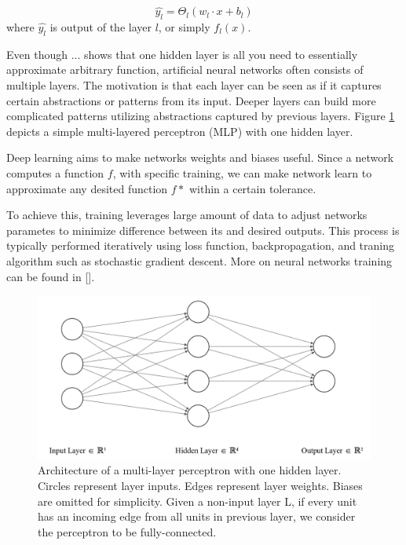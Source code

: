 \begin{equation}
\hat{y_l} = \Theta_l(w_l \cdot x + b_l)
\end{equation}
where $\hat{y_l}$ is output of the layer $l$, or simply $f_l(x)$.



Even though ... shows that one hidden layer is all you need to essentially approximate arbitrary function, artificial neural networks often consists of multiple layers. The motivation is that each layer can be seen as if it captures certain abstractions or patterns from its input. Deeper layers can build more complicated patterns utilizing abstractions captured by previous layers. Figure \ref{fig:simple-mlp} depicts a simple multi-layered perceptron (MLP) with one hidden layer.

Deep learning aims to make networks weights and biases useful. Since a network computes a function $f$, with specific training, we can make network learn to approximate any desited function $f*$ within a certain tolerance.

To achieve this, training leverages large amount of data to adjust networks parametes to minimize difference between its and desired outputs. This process is typically performed iteratively using loss function, backpropagation, and traning algorithm such as stochastic gradient descent. More on neural networks training can be found in [].


\begin{figure}[!h]
    \begin{center}
    \begin{minipage}{.75\textwidth}
      \includegraphics[width=\textwidth]{img/nn.png}
    \end{minipage}
    \caption{Architecture of a multi-layer perceptron with one hidden layer. Circles represent layer inputs. Edges represent layer weights. Biases are omitted for simplicity. Given a non-input layer L, if every unit has an incoming edge from all units in previous layer, we consider the perceptron to be fully-connected.}
    \label{fig:simple-mlp}
    \end{center}
\end{figure}

